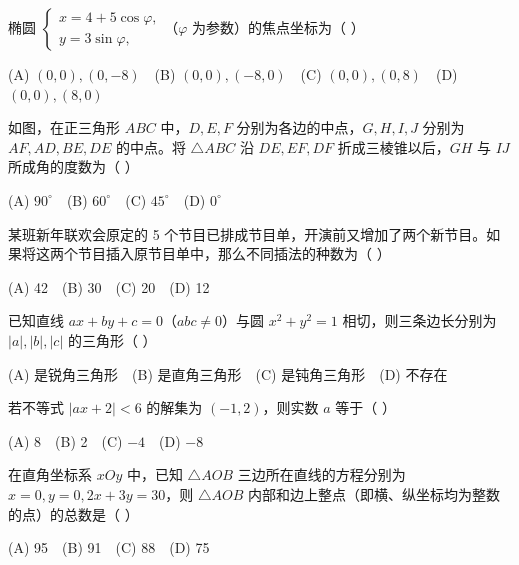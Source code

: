 \begin{question}
椭圆 $\begin{cases}x=4+5\cos\varphi,\\y=3\sin\varphi,\end{cases}$（$\varphi$ 为参数）的焦点坐标为（ ）

   (A) $(0,0),(0,-8)$　(B) $(0,0),(-8,0)$　(C) $(0,0),(0,8)$　(D) $(0,0),(8,0)$

\Needspace{0.4\textheight}
\end{question}
\begin{question}
如图，在正三角形 $ABC$ 中，$D,E,F$ 分别为各边的中点，\newline $G,H,I,J$ 分别为 $AF,AD,BE,DE$ 的中点。将 $\triangle ABC$ 沿 $DE,EF,DF$ 折成三棱锥以后，$GH$ 与 $IJ$ 所成角的度数为（ ）
\nopagebreak[4]
\begin{center}\end{center}
\nopagebreak[4]
   (A) $90^\circ$　(B) $60^\circ$　(C) $45^\circ$　(D) $0^\circ$

\end{question}
\begin{question}
某班新年联欢会原定的 5 个节目已排成节目单，开演前又增加了两个新节目。如果将这两个节目插入原节目单中，那么不同插法的种数为（ ）

   (A) 42　(B) 30　(C) 20　(D) 12

\end{question}
\begin{question}
已知直线 $ax+by+c=0$（$abc\ne0$）与圆 $x^2+y^2=1$ 相切，则三条边长分别为 $|a|,|b|,|c|$ 的三角形（ ）

    (A) 是锐角三角形　(B) 是直角三角形　(C) 是钝角三角形　(D) 不存在

\end{question}
\begin{question}
若不等式 $|ax+2|<6$ 的解集为 $(-1,2)$，则实数 $a$ 等于（ ）

    (A) 8　(B) 2　(C) $-4$　(D) $-8$

\end{question}
\begin{question}
在直角坐标系 $xOy$ 中，已知 $\triangle AOB$ 三边所在直线的方程分别为 $x=0,y=0,2x+3y=30$，则 $\triangle AOB$ 内部和边上整点（即横、纵坐标均为整数的点）的总数是（ ）

    (A) 95　(B) 91　(C) 88　(D) 75

\end{question}

